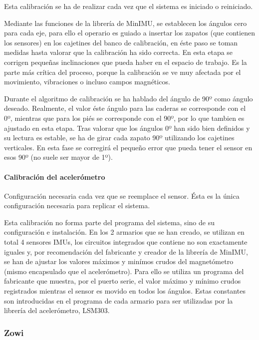 Esta calibración se ha de realizar cada vez que el sistema es iniciado o reiniciado.

Mediante las funciones de la librería de MinIMU, se establecen los ángulos cero para cada eje, para ello el operario es guiado a insertar los zapatos (que contienen los sensores) en los cajetines del banco de calibración, en éste paso se toman medidas hasta valorar que la calibración ha sido correcta. En esta etapa se corrigen pequeñas inclinaciones que pueda haber en el espacio de trabajo. Es la parte más crítica del proceso, porque la calibración se ve muy afectada por el movimiento, vibraciones o incluso campos magnéticos.

Durante el algoritmo de calibración se ha hablado del ángulo de 90º como ángulo deseado. Realmente, el valor éste ángulo para las caderas se corresponde con el 0º, mientras que para los piés se corresponde con el 90º, por lo que tambien es ajustado en esta etapa. Tras valorar que los ángulos 0º han sido bien definidos y su lectura es estable, se ha de girar cada zapato 90º utilizando los cajetines verticales. En esta fase se corregirá el pequeño error que pueda tener el sensor en esos 90º (no suele ser mayor de 1º).

\paragraph{Calibración del acelerómetro}

Configuración necesaria cada vez que se reemplace el sensor. Ésta es la única configuración necesaria para replicar el sistema.

Esta calibración no forma parte del programa del sistema, sino de su configuración e instalación. En los 2 armarios que se han creado, se utilizan en total 4 sensores IMUs, los circuitos integrados que contiene no son exactamente iguales y, por recomendación del fabricante y creador de la librería de MinIMU, se han de ajustar los valores máximos y minímos crudos del magnetómetro (mismo encapsulado que el acelerómetro). Para ello se utiliza un programa del fabricante que muestra, por el puerto serie, el valor máximo y mínimo crudos registrados mientras el sensor es movido en todos los ángulos. Estas constantes son introducidas en el programa de cada armario para ser utilizadas por la librería del acelerómetro, LSM303.

\subsubsection{Zowi}

